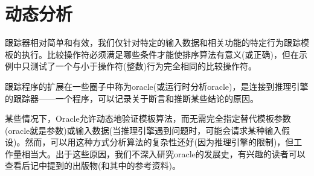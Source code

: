 \section{动态分析}
跟踪器相对简单和有效，我们仅针对特定的输入数据和相关功能的特定行为跟踪模板的执行。比较操作符必须满足哪些条件才能使排序算法有意义(或正确)，但在示例中只测试了一个与小于操作符(整数)行为完全相同的比较操作符。

跟踪程序的扩展在一些圈子中称为oracle(或运行时分析oracle)，是连接到推理引擎的跟踪器——一个程序，可以记录关于断言和推断某些结论的原因。

某些情况下，Oracle允许动态地验证模板算法，而无需完全指定替代模板参数(oracle就是参数)或输入数据(当推理引擎遇到问题时，可能会请求某种输入假设)。然而，可以用这种方式分析算法的复杂性还好(因为推理引擎的限制)，但工作量相当大。出于这些原因，我们不深入研究oracle的发展史，有兴趣的读者可以查看后记中提到的出版物(和其中的参考资料)。